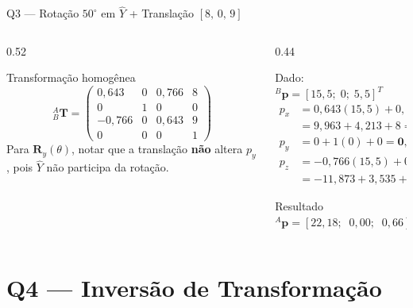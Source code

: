 \documentclass[aspectratio=169,12pt]{beamer}
\newcommand{\Ry}[1]{\mathbf{R}_y(#1)}
\newcommand{\Trans}[2]{{}^{#1}_{#2}\!\mathbf{T}}
\newcommand{\degr}{^{\circ}}
\newcommand{\mat}[1]{\begin{pmatrix}#1\end{pmatrix}}
\begin{document}
\begin{frame}{Q3 --- Rotação $50\degr$ em $\hat{Y}$ + Translação $[8,\,0,\,9]$}
  \begin{columns}
    \begin{column}{0.52\textwidth}
      \begin{block}{Transformação homogênea}
        \[
          \Trans{A}{B} = \mat{
            0{,}643 & 0 & 0{,}766 & 8\\
            0       & 1 & 0       & 0\\
           -0{,}766 & 0 & 0{,}643 & 9\\
            0       & 0 & 0       & 1}
        \]
        \small Para $\Ry{\theta}$, notar que a translação \textbf{não} altera $p_y$, pois $\hat{Y}$ não participa da rotação.
      \end{block}
    \end{column}
    \begin{column}{0.44\textwidth}
      \begin{block}{Dado: ${}^{B}\mathbf{p}=[15{,}5;\;0;\;5{,}5]^T$}
        \small
        \begin{align*}
          p_x &= 0{,}643(15{,}5)+0{,}766(5{,}5)+8\\
              &= 9{,}963+4{,}213+8 = \mathbf{22{,}18}\\[3pt]
          p_y &= 0 + 1(0) + 0 = \mathbf{0{,}00}\\[3pt]
          p_z &= -0{,}766(15{,}5)+0{,}643(5{,}5)+9\\
              &= -11{,}873+3{,}535+9 = \mathbf{0{,}66}
        \end{align*}
      \end{block}
      \begin{exampleblock}{Resultado}
        ${}^{A}\mathbf{p} = [22{,}18;\;\;0{,}00;\;\;0{,}66]^T$
      \end{exampleblock}
    \end{column}
  \end{columns}
\end{frame}

\section{Q4 --- Inversão de Transformação}
\end{document}
